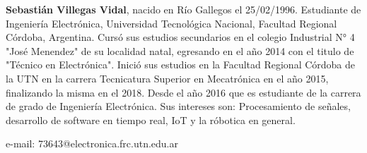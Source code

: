 \documentclass[conference]{IEEEtran}
\begin{document}
\textbf{Sebastián Villegas Vidal}, nacido en Río Gallegos el 25/02/1996. Estudiante de Ingeniería Electrónica, Universidad Tecnológica Nacional, Facultad Regional Córdoba, Argentina. Cursó sus estudios secundarios en el colegio Industrial N° 4 "José Menendez" de su localidad natal, egresando en el año 2014 con el titulo de "Técnico en Electrónica". Inició sus estudios en la Facultad Regional Córdoba de la UTN en la carrera Tecnicatura Superior en Mecatrónica en el año 2015, finalizando la misma en el 2018. Desde el año 2016 que es estudiante de la carrera de grado de Ingeniería Electrónica. 
Sus intereses son: Procesamiento de señales, desarrollo de software en tiempo real, IoT y la róbotica en general.

e-mail: 73643@electronica.frc.utn.edu.ar
\end{document}
